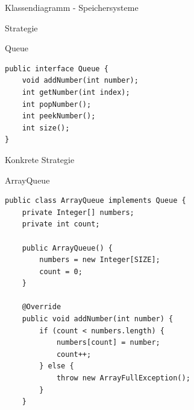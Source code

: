 \begin{frame}{Klassendiagramm - Speichersysteme}
\end{frame}

\begin{frame}[fragile]{Strategie}
	\begin{exampleblock}{Queue}
 		\begin{lstlisting}
public interface Queue {
	void addNumber(int number);
	int getNumber(int index);
	int popNumber();
	int peekNumber();
	int size();
}
 		\end{lstlisting}
 	\end{exampleblock}
\end{frame}

\begin{frame}[fragile]{Konkrete Strategie}
	\begin{exampleblock}{ArrayQueue}
 		\begin{lstlisting}
public class ArrayQueue implements Queue {
	private Integer[] numbers;
	private int count;
	
	public ArrayQueue() {
		numbers = new Integer[SIZE];
		count = 0;
	}
	
	@Override
	public void addNumber(int number) {
		if (count < numbers.length) {
			numbers[count] = number;
			count++;
		} else {
			throw new ArrayFullException();
		}
	}   
 		\end{lstlisting}
 	\end{exampleblock}
\end{frame}


